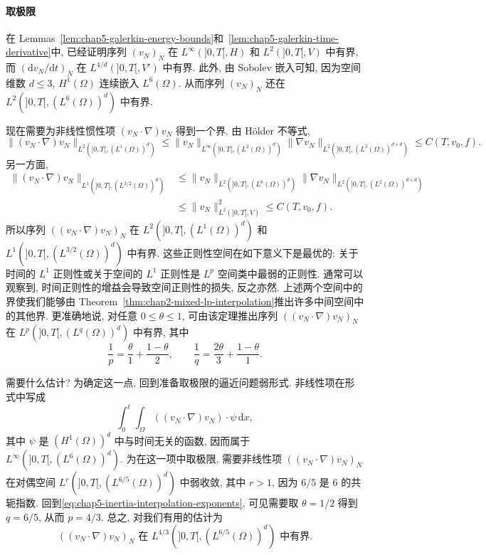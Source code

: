 \paragraph{取极限}

在 Lemmas~\ref{lem:chap5-galerkin-energy-bounds}和~\ref{lem:chap5-galerkin-time-derivative}中, 已经证明序列 $(v_N)_N$ 在 $L^\infty(]0,T[,H)$ 和 $L^2(]0,T[,V)$ 中有界, 而 $(\mathrm dv_N/\mathrm dt)_N$ 在 $L^{4/d}(]0,T[,V')$ 中有界. 此外, 由 Sobolev 嵌入可知, 因为空间维数 $d\leq3$, $H^1(\Omega)$ 连续嵌入 $L^6(\Omega)$. 从而序列 $(v_N)_N$ 还在 $L^2(]0,T[,(L^6(\Omega))^d)$ 中有界.

现在需要为非线性惯性项 $(v_N\cdot\nabla)v_N$ 得到一个界. 由 Hölder 不等式,
\[
 \|(v_N\cdot\nabla)v_N\|_{L^2(]0,T[,(L^1(\Omega))^d)}
 \leq\|v_N\|_{L^\infty(]0,T[,(L^2(\Omega))^d)}
 \|\nabla v_N\|_{L^2(]0,T[,(L^2(\Omega))^{d\times d})}
 \leq C(T,v_0,f).
\]
另一方面,
\begin{align*}
 \|(v_N\cdot\nabla)v_N\|_{L^1(]0,T[,(L^{3/2}(\Omega))^d)}
 &\leq\|v_N\|_{L^2(]0,T[,(L^6(\Omega))^d)}
 \|\nabla v_N\|_{L^2(]0,T[,(L^2(\Omega))^{d\times d})}\\
 &\leq\|v_N\|_{L^2(]0,T[,V)}^2
 \leq C(T,v_0,f).
\end{align*}
所以序列 $((v_N\cdot\nabla)v_N)_N$ 在 $L^2(]0,T[,(L^1(\Omega))^d)$ 和 $L^1(]0,T[,(L^{3/2}(\Omega))^d)$ 中有界. 这些正则性空间在如下意义下是最优的: 关于时间的 $L^1$ 正则性或关于空间的 $L^1$ 正则性是 $L^p$ 空间类中最弱的正则性. 通常可以观察到, 时间正则性的增益会导致空间正则性的损失, 反之亦然. 上述两个空间中的界使我们能够由 Theorem~\ref{thm:chap2-mixed-lp-interpolation}推出许多中间空间中的其他界. 更准确地说, 对任意 $0\leq\theta\leq1$, 可由该定理推出序列 $((v_N\cdot\nabla)v_N)_N$ 在 $L^p(]0,T[,(L^q(\Omega))^d)$ 中有界, 其中
\begin{equation}
 \frac1p=\frac\theta1+\frac{1-\theta}2,
 \qquad
 \frac1q=\frac{2\theta}3+\frac{1-\theta}1.
\label{eq:chap5-inertia-interpolation-exponents}
\end{equation}

需要什么估计? 为确定这一点, 回到准备取极限的逼近问题弱形式. 非线性项在形式中写成
\[
 \int_0^t\int_\Omega((v_N\cdot\nabla)v_N)\cdot\psi\,\mathrm dx,
\]
其中 $\psi$ 是 $(H^1(\Omega))^d$ 中与时间无关的函数, 因而属于 $L^\infty(]0,T[,(L^6(\Omega))^d)$. 为在这一项中取极限, 需要非线性项 $((v_N\cdot\nabla)v_N)_N$ 在对偶空间 $L^r(]0,T[,(L^{6/5}(\Omega))^d)$ 中弱收敛, 其中 $r>1$, 因为 $6/5$ 是 $6$ 的共轭指数. 回到\eqref{eq:chap5-inertia-interpolation-exponents}, 可见需要取 $\theta=1/2$ 得到 $q=6/5$, 从而 $p=4/3$. 总之, 对我们有用的估计为
\begin{equation}
 ((v_N\cdot\nabla)v_N)_N
 \text{ 在 }L^{4/3}(]0,T[,(L^{6/5}(\Omega))^d)\text{ 中有界}.
\label{eq:chap5-inertia-useful-bound}
\end{equation}

